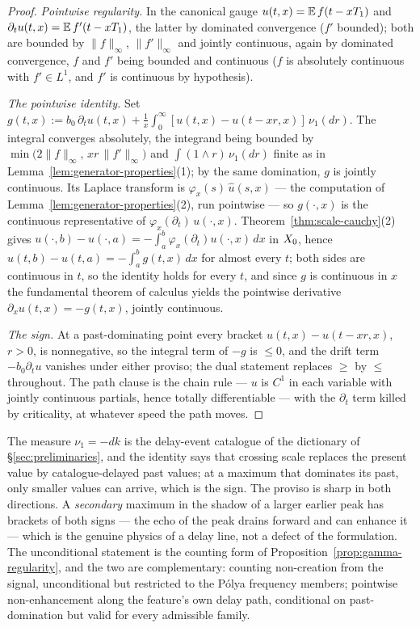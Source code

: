\begin{proof}
\emph{Pointwise regularity.} In the canonical gauge $u(t,x) = \mathbb{E}\,f(t - xT_1)$ and
$\partial_t u(t,x) = \mathbb{E}\,f'(t - xT_1)$, the latter by dominated convergence ($f'$ bounded);
both are bounded by $\|f\|_\infty$, $\|f'\|_\infty$ and jointly continuous, again by
dominated convergence, $f$ and $f'$ being bounded and continuous ($f$ is absolutely
continuous with $f' \in L^1$, and $f'$ is continuous by hypothesis).

\emph{The pointwise identity.} Set
$g(t,x) := b_0\,\partial_t u(t,x) + \tfrac1x\int_0^\infty [u(t,x) - u(t-xr,x)]\,\nu_1(dr)$.
The integral converges absolutely, the integrand being bounded by
$\min\bigl(2\|f\|_\infty,\, xr\,\|f'\|_\infty\bigr)$ and $\int (1 \wedge r)\,\nu_1(dr)$
finite as in Lemma~\ref{lem:generator-properties}(1); by the same domination, $g$ is jointly
continuous. Its Laplace transform is $\varphi_x(s)\,\hat u(s,x)$ --- the computation of
Lemma~\ref{lem:generator-properties}(2), run pointwise --- so $g(\cdot, x)$ is the
continuous representative of $\varphi_x(\partial_t)\,u(\cdot,x)$. Theorem~\ref{thm:scale-cauchy}(2)
gives $u(\cdot,b) - u(\cdot,a) = -\int_a^b \varphi_x(\partial_t)u(\cdot,x)\,dx$ in $X_0$,
hence $u(t,b) - u(t,a) = -\int_a^b g(t,x)\,dx$ for almost every $t$; both sides are
continuous in $t$, so the identity holds for every $t$, and since $g$ is continuous in $x$
the fundamental theorem of calculus yields the pointwise derivative
$\partial_x u(t,x) = -g(t,x)$, jointly continuous.

\emph{The sign.} At a past-dominating point every bracket $u(t,x) - u(t-xr,x)$, $r > 0$, is
nonnegative, so the integral term of $-g$ is $\le 0$, and the drift term $-b_0\partial_t u$
vanishes under either proviso; the dual statement replaces $\ge$ by $\le$ throughout.
The path clause is the chain rule --- $u$ is $C^1$ in each variable with jointly continuous
partials, hence totally differentiable --- with the $\partial_t$ term killed by criticality,
at whatever speed the path moves.
\end{proof}

The measure $\nu_1 = -dk$ is the delay-event catalogue of the dictionary of
\S\ref{sec:preliminaries}, and the identity says that crossing scale replaces the present
value by catalogue-delayed past values; at a maximum that dominates its past, only smaller
values can arrive, which is the sign. The proviso is sharp in both directions. A
\emph{secondary} maximum in the shadow of a larger earlier peak has brackets of both signs
--- the echo of the peak drains forward and can enhance it --- which is the genuine physics
of a delay line, not a defect of the formulation. The unconditional statement is the
counting form of Proposition~\ref{prop:gamma-regularity}, and the two are complementary:
counting non-creation from the signal, unconditional but restricted to the P\'olya
frequency members;
pointwise non-enhancement along the feature's own delay path, conditional on past-domination
but valid for every admissible family.

